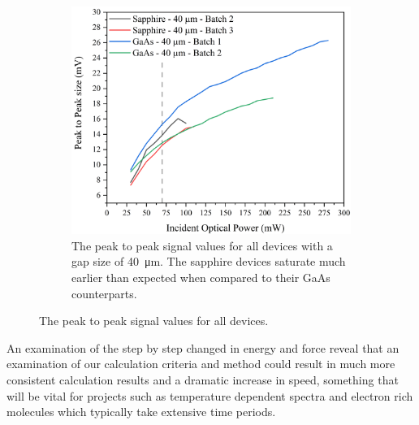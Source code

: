 \begin{figure}[ht]
\begin{subfigure}{0.49\textwidth}
\centering
\includegraphics[width=\textwidth]{Figures/Misc/SysDev/Opt40micronG.png}
\caption{The peak to peak signal values for all devices with a gap size of \SI{40}{\micro\metre}. The sapphire devices saturate much earlier than expected when compared to their GaAs counterparts.}
\label{fig:40micron}
\end{subfigure}

\captionsetup{font = footnotesize, justification = centering}
\caption{The peak to peak signal values for all devices.}
\label{Fig:102040micron}
\end{figure}




An examination of the step by step changed in energy and force reveal that an examination of our calculation criteria and method could result in much more consistent calculation results and a dramatic increase in speed, something that will be vital for projects such as temperature dependent spectra and electron rich molecules which typically take extensive time periods. 




